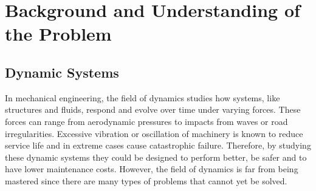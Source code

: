 \documentclass[12pt]{article}
\begin{document}

    \section{Background and Understanding of the Problem}

    \subsection{Dynamic Systems}
    In mechanical engineering, the field of dynamics studies how systems, like structures and fluids, respond and evolve over time under varying forces.
    These forces can range from aerodynamic pressures to impacts from waves or road irregularities.
    Excessive vibration or oscillation of machinery is known to reduce service life and in extreme cases cause catastrophic failure.
    Therefore, by studying these dynamic systems they could be designed to perform better, be safer and to have lower maintenance costs.
    However, the field of dynamics is far from being mastered since there are many types of problems that cannot yet be solved.
\end{document}
